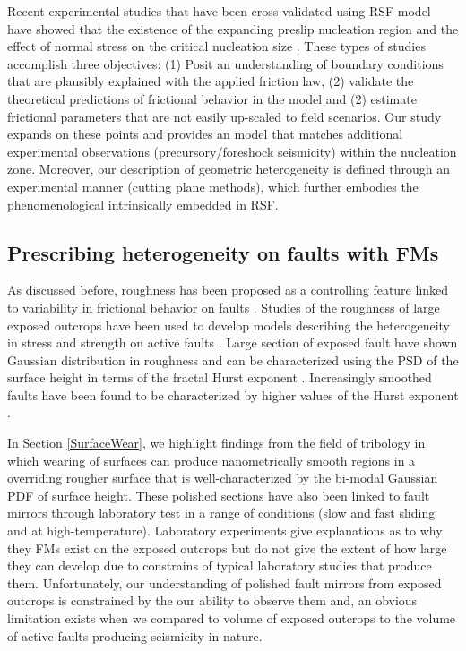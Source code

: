 \documentclass[preprint,1p, 10pt,authoryear]{elsarticle}
\begin{document}
Recent experimental studies that have been cross-validated using RSF model have showed that the existence of the expanding preslip nucleation region  \citep{Nielsen2010,Kaneko2011} and the effect of normal stress on the critical nucleation size \citep{Latour2013,Kaneko2016}. These types of studies accomplish three objectives: (1) Posit an understanding of boundary conditions that are plausibly explained with the applied friction law, (2) validate the theoretical predictions of frictional behavior in the model \citep{Ruina1983,Rubin2005,Ampuero2008} and (2) estimate frictional parameters that are not easily up-scaled to field scenarios. Our study expands on these points and provides an model that matches additional experimental observations (precursory/foreshock seismicity) within the nucleation zone. Moreover, our description of geometric heterogeneity is defined through an experimental manner (cutting plane methods), which further embodies the phenomenological intrinsically embedded in RSF.

\subsection{Prescribing heterogeneity on faults with FMs }
As discussed before, roughness has been proposed as a controlling feature linked to variability in frictional behavior on faults \citep{Scholz1986,Scholz2002}. Studies of the roughness of large exposed outcrops have been used to develop models describing the heterogeneity in stress and strength on active faults \citep[e.g.,][]{Schmittbuhl2006}. Large section of exposed fault have shown Gaussian distribution in roughness \citep[e.g.,][]{Renard2006} and can be characterized using the PSD of the surface height in terms of the fractal Hurst exponent \citep{Power1991, Schmittbuhl1995, Candela2009}. Increasingly smoothed faults have been found to be characterized by higher values of the Hurst exponent \citep{Brodsky2011, Siman-Tov2013, Kirkpatrick2014, Candela2016, Brodsky2016}. 

In Section \ref{SurfaceWear}, we highlight findings from the field of tribology in which wearing of surfaces can produce nanometrically smooth regions in a overriding rougher surface that is well-characterized by the bi-modal Gaussian PDF of surface height. These polished sections have also been linked to fault mirrors through laboratory test in a range of conditions (slow and fast sliding and at high-temperature).  Laboratory experiments give explanations as to why they FMs exist on the exposed outcrops but do not give the extent of how large they can develop due to constrains of typical laboratory studies that produce them. Unfortunately, our understanding of polished fault mirrors from exposed outcrops is constrained by the our ability to observe them and, an obvious limitation exists when we compared to volume of exposed outcrops to the volume of active faults producing seismicity in nature.  
\end{document}
